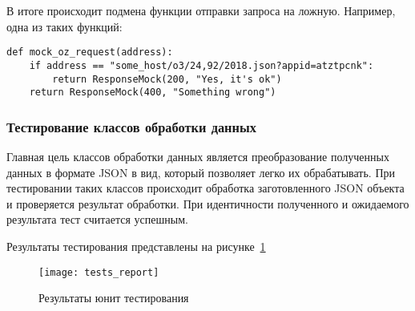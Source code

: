 В итоге происходит подмена функции отправки запроса на ложную.
Например, одна из таких функций:
\begin{lstlisting}
def mock_oz_request(address):
    if address == "some_host/o3/24,92/2018.json?appid=atztpcnk":
        return ResponseMock(200, "Yes, it's ok")
    return ResponseMock(400, "Something wrong")
\end{lstlisting}

\subsubsection{Тестирование классов обработки данных}

Главная цель классов обработки данных является преобразование полученных данных в формате JSON в вид, который позволяет легко их обрабатывать.
При тестировании таких классов происходит обработка заготовленного JSON объекта и проверяется результат обработки.
При идентичности полученного и ожидаемого результата тест считается успешным.

Результаты тестирования представлены на рисунке~\ref{pic:lit_testing:tests_report}

\begin{figure}
    \centering
    \texttt{[image: tests\_report]}
    \caption{Результаты юнит тестирования}
    \label{pic:lit_testing:tests_report}
\end{figure}
